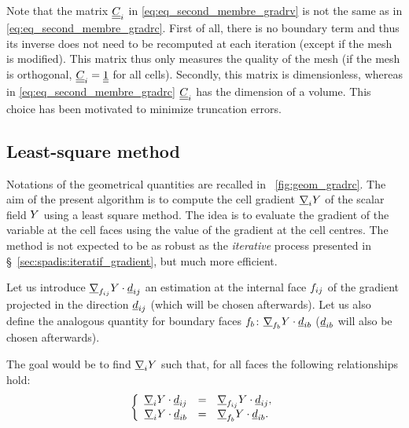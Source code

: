 \begin{remark}
Note that the matrix $\underline{\underline{C}}_{i}$ in \eqref{eq:eq_second_membre_gradrv} is not the same as in \eqref{eq:eq_second_membre_gradrc}. First of all,
there is no boundary term and thus its inverse does not need  to be recomputed at each iteration (except if the mesh is modified). This matrix thus  only
measures the quality of the mesh (if the mesh is orthogonal, $\underline{\underline{C}}_{i} = \underline{\underline{1}}$ for all cells).
Secondly, this matrix is dimensionless, whereas in \eqref{eq:eq_second_membre_gradrc} $\underline{\underline{C}}_i$ has the dimension of a volume. This choice has
been motivated to minimize truncation errors.
\end{remark}

\subsection{Least-square method}\label{sec:spadis:least_square_gradient}
%
Notations of the geometrical quantities are recalled in \figurename~\ref{fig:geom_gradrc}.
The aim of the present algorithm is to compute the cell gradient $\underline{\nabla}_{i} Y $ of the scalar field $Y$
using a least square method.
The idea is to evaluate the gradient of the variable at the cell faces using the value of the gradient at the cell centres.
The method is not expected to be as robust as the \emph{iterative} process presented in \S~\ref{sec:spadis:iteratif_gradient},
but much more efficient.

Let us introduce $\underline{\nabla}_{f_{ij}} Y \cdot \underline{d}_{ij}$  an estimation at the internal face ${f_{ij}}$
of the gradient projected in the direction $\underline{d}_{ij}$ (which will be chosen afterwards).
Let us also define the analogous quantity for boundary faces ${f_{b}}$: $\underline{\nabla}_{f_{b}} Y \cdot \underline{d}_{ib}$
 ($\underline{d}_{ib}$ will also be chosen afterwards).

The goal would be to find $\underline{\nabla}_{i} Y $ such that, for all faces
the following relationships hold:
\begin{equation}
\left\{\begin{array}{r c l}
\underline{\nabla}_{i} Y  \cdot \underline{d}_{ij} &=& \underline{\nabla}_{f_{ij}} Y \cdot \underline{d}_{ij} , \\
\underline{\nabla}_{i} Y  \cdot \underline{d}_{ib} &=& \underline{\nabla}_{f_{b}} Y \cdot \underline{d}_{ib} .
\end{array}\right.
\end{equation}

